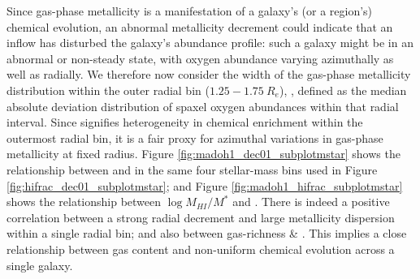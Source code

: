 Since gas-phase metallicity is a manifestation of a galaxy's (or a region's) chemical evolution, an abnormal metallicity decrement could indicate that an inflow has disturbed the galaxy's abundance profile: such a galaxy might be in an abnormal or non-steady state, with oxygen abundance varying azimuthally as well as radially. We therefore now consider the width of the gas-phase metallicity distribution within the outer radial bin ($1.25-1.75 ~ R_e$), \metdisp, defined as the median absolute deviation distribution of spaxel oxygen abundances within that radial interval. Since \metdisp signifies heterogeneity in chemical enrichment within the outermost radial bin, it is a fair proxy for azimuthal variations in gas-phase metallicity at fixed radius. Figure \ref{fig:madoh1_dec01_subplotmstar} shows the relationship between \metdisp and \metdec in the same four stellar-mass bins used in Figure \ref{fig:hifrac_dec01_subplotmstar}; and Figure \ref{fig:madoh1_hifrac_subplotmstar} shows the relationship between $\log M_{HI} / M^*$ and \metdisp. There is indeed a positive correlation between a strong radial decrement and large metallicity dispersion within a single radial bin; and also between gas-richness \& \metdisp. This implies a close relationship between gas content and non-uniform chemical evolution across a single galaxy.

